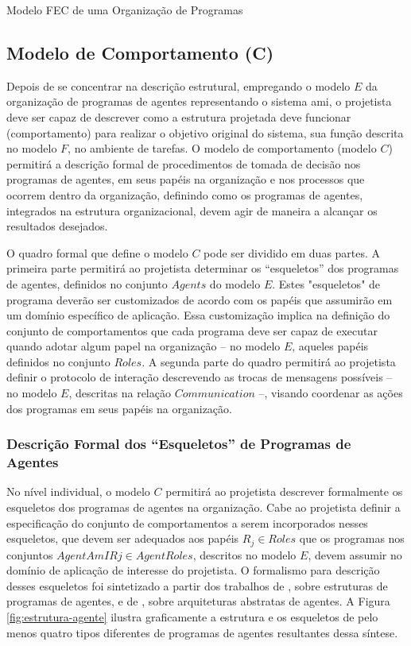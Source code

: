 \begin{section}{Modelo FEC de uma Organização de Programas}
    
    \subsection{Modelo de Comportamento (C)}
    
        Depois de se concentrar na descrição estrutural, empregando o modelo $E$ da organização de programas de agentes representando o sistema \acrshort{ami}, o projetista deve ser capaz de descrever como a estrutura projetada deve funcionar (comportamento) para realizar o objetivo original do sistema, sua função descrita no modelo $F$, no ambiente de tarefas. O modelo de comportamento (modelo $C$) permitirá a descrição formal de procedimentos de tomada de decisão nos programas de agentes, em seus papéis na organização e nos processos que ocorrem dentro da organização, definindo como os programas de agentes, integrados na estrutura organizacional, devem agir de maneira a alcançar os resultados desejados.
        
        O quadro formal que define o modelo $C$ pode ser dividido em duas partes. A primeira parte permitirá ao projetista determinar os “esqueletos” dos programas de agentes, definidos no conjunto $Agents$ do modelo $E$. Estes "esqueletos" de programa deverão ser customizados de acordo com os papéis que assumirão em um domínio específico de aplicação. Essa customização implica na definição do conjunto de comportamentos que cada programa deve ser capaz de executar quando adotar algum papel na organização -- no modelo $E$, aqueles papéis definidos no conjunto $Roles$. A segunda parte do quadro permitirá ao projetista definir o protocolo de interação descrevendo as trocas de mensagens possíveis -- no modelo $E$, descritas na relação $Communication$ --, visando coordenar as ações dos programas em seus papéis na organização.
        
        \subsubsection{Descrição Formal dos “Esqueletos” de Programas de Agentes}
        
            No nível individual, o modelo $C$ permitirá ao projetista descrever formalmente os esqueletos dos programas de agentes na organização. Cabe ao projetista definir a especificação do conjunto de comportamentos a serem incorporados nesses esqueletos, que devem ser adequados aos papéis $R_j \in Roles$ que os programas nos conjuntos $AgentAmIRj \in AgentRoles$, descritos no modelo $E$, devem assumir no domínio de aplicação de interesse do projetista. O formalismo para descrição desses esqueletos foi sintetizado a partir dos trabalhos de , sobre estruturas de programas de agentes, e de , sobre arquiteturas abstratas de agentes. A Figura \ref{fig:estrutura-agente} ilustra graficamente a estrutura e os esqueletos de pelo menos quatro tipos diferentes de programas de agentes resultantes dessa síntese.
            

\end{section}

